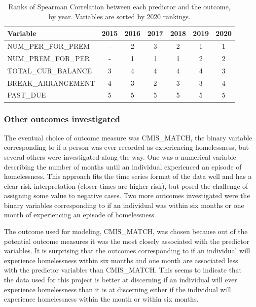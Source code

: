 \documentclass[10pt,letterpaper]{article}
\begin{document}
\begin{table}[!h]
    \centering
    \begin{tabular}{lcccccc}
        \toprule
                 Variable &  2015 &  2016 &  2017 &  2018 &  2019 &  2020 \\
        \midrule
        NUM\_PER\_FOR\_PREM &     - &     2 &     3 &     2 &     1 &     1 \\
        NUM\_PREM\_FOR\_PER &     - &     1 &     1 &     1 &     2 &     2 \\
        TOTAL\_CUR\_BALANCE &     3 &     4 &     4 &     4 &     4 &     3 \\
        BREAK\_ARRANGEMENT  &     4 &     3 &     2 &     3 &     3 &     4 \\
        PAST\_DUE           &     5 &     5 &     5 &     5 &     5 &     5 \\
        \bottomrule
    \end{tabular}
\caption{Ranks of Spearman Correlation between each predictor and the outcome, by year. Variables are sorted by 2020 rankings.}
\label{tbl:corr_years}
\end{table}

\subsubsection*{Other outcomes investigated}
The eventual choice of outcome measure was CMIS\_MATCH, the binary variable corresponding to if a person was ever recorded as experiencing homelessness, but several others were investigated along the way. One was a numerical variable describing the number of months until an individual experienced an episode of homelessness. This approach fits the time series format of the data well and has a clear risk interpretation (closer times are higher risk), but posed the challenge of assigning some value to negative cases. Two more outcomes investigated were the binary variables corresponding to if an individual was within six months or one month of experiencing an episode of homelessness.

The outcome used for modeling, CMIS\_MATCH, was chosen because out of the potential outcome measures it was the most closely associated with the predictor variables. It is surprising that the outcomes corresponding to if an individual will experience homelessness within six months and one month are associated less with the predictor variables than CMIS\_MATCH. This seems to indicate that the data used for this project is better at discerning if an individual will ever experience homelessness than it is at discerning either if the individual will experience homelessness within the month or within six months.
\end{document}
